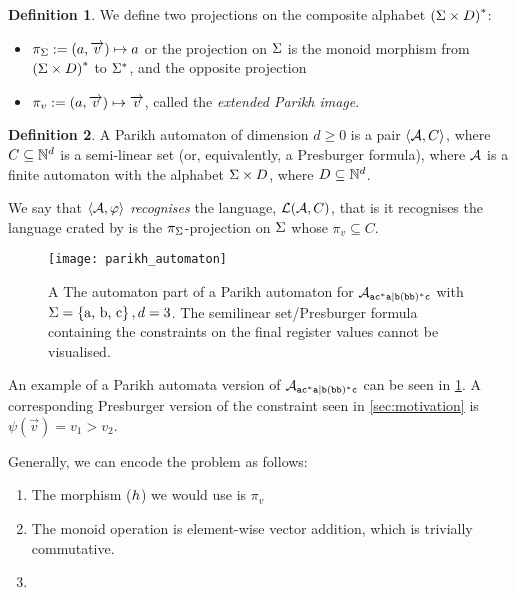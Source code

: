 \documentclass[acmsmall,review,anonymous,screen]{acmart}\settopmatter{printfolios=true,printccs=false,printacmref=true}
\theoremstyle{definition}
\newtheorem{definition}{Definition}[section]
\begin{document}
\begin{definition}\label{def:projections}
  We define two projections on the composite alphabet $\left(\Sigma \times D\right)^*$:
  \begin{itemize}
    \item $\pi_{\Sigma} := (a, \overrightarrow{v}) \mapsto a$ or the projection on $\Sigma$ is the monoid morphism from $\left(\Sigma \times D\right)^*$ to $\Sigma^*$, and the opposite projection
    \item $\pi_{v} := (a, \overrightarrow{v}) \mapsto \overrightarrow{v}$, called the
    \emph{extended Parikh image}.
  \end{itemize}
\end{definition}

\begin{definition}\label{def:parikh-automata} A Parikh automaton of dimension $d
  \geq 0$ is a pair $\left\langle\mathcal{A}, C\right\rangle$, where $C \subseteq \mathbb{N}^d$ is a semi-linear set (or, equivalently, a Presburger formula), where $\mathcal{A}$ is a finite automaton with the alphabet $\Sigma \times D$, where $D \subseteq \mathbb{N}^d$.

  We say that $\left\langle\mathcal{A}, \varphi\right\rangle$ \emph{recognises} the language, $\operatorname{\mathcal{L}}(\mathcal{A}, C)$, that is it recognises the language crated by is the $\pi_\Sigma$-projection on $\Sigma$ whose $\pi_{v} \subseteq C$.
\end{definition}

\begin{figure}[ht]
  \centering
      \texttt{[image: parikh\_automaton]}
      \caption{A The automaton part of a Parikh automaton for $\mathcal{A}_{\mathtt{ac^*a|b(bb)^*c}}{}$ with
      $\Sigma = \left\{\text{a, b, c}\right\}, d = 3$. The semilinear set/Presburger
      formula containing the constraints on the final register values cannot be
      visualised.}\label{fig:parikh-automaton}
    \end{figure}
  

An example of a Parikh automata version of $\mathcal{A}_{\mathtt{ac^*a|b(bb)^*c}}{}$ can be seen in
\cref{fig:parikh-automaton}. A corresponding Presburger version of the
constraint seen in \cref{sec:motivation} is $\psi(\Vec{v}) = v_1 > v_2$.

Generally, we can encode the problem as follows:
\begin{enumerate}
  \item The morphism ($h$) we would use is $\pi_{v}$
  \item The monoid operation is element-wise vector addition, which is trivially commutative.
  \item {}
\end{enumerate}
\end{document}
